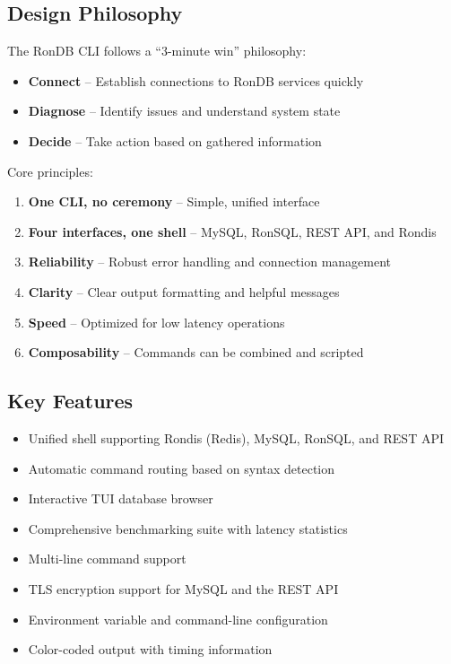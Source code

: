 \documentclass[11pt,a4paper]{report}
\begin{document}
\subsection{Design Philosophy}

The RonDB CLI follows a ``3-minute win'' philosophy:
\begin{itemize}
    \item \textbf{Connect} -- Establish connections to RonDB services quickly
    \item \textbf{Diagnose} -- Identify issues and understand system state
    \item \textbf{Decide} -- Take action based on gathered information
\end{itemize}

\noindent Core principles:
\begin{enumerate}
    \item \textbf{One CLI, no ceremony} -- Simple, unified interface
    \item \textbf{Four interfaces, one shell} -- MySQL, RonSQL, REST API, and Rondis
    \item \textbf{Reliability} -- Robust error handling and connection management
    \item \textbf{Clarity} -- Clear output formatting and helpful messages
    \item \textbf{Speed} -- Optimized for low latency operations
    \item \textbf{Composability} -- Commands can be combined and scripted
\end{enumerate}

\subsection{Key Features}

\begin{itemize}
    \item Unified shell supporting Rondis (Redis), MySQL, RonSQL, and REST API
    \item Automatic command routing based on syntax detection
    \item Interactive TUI database browser
    \item Comprehensive benchmarking suite with latency statistics
    \item Multi-line command support
    \item TLS encryption support for MySQL and the REST API
    \item Environment variable and command-line configuration
    \item Color-coded output with timing information
\end{itemize}
\end{document}
